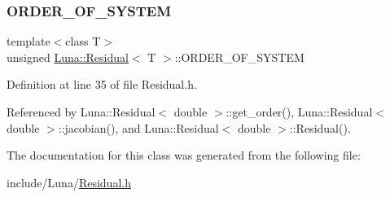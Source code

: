 \mbox{\label{classLuna_1_1Residual_a7facf1267eb277d84aeea8beba2cb200}} 
\subsubsection{\texorpdfstring{O\+R\+D\+E\+R\+\_\+\+O\+F\+\_\+\+S\+Y\+S\+T\+EM}{ORDER\_OF\_SYSTEM}}
{\footnotesize\ttfamily template$<$class T$>$ \\
unsigned \hyperlink{classLuna_1_1Residual}{Luna\+::\+Residual}$<$ T $>$\+::O\+R\+D\+E\+R\+\_\+\+O\+F\+\_\+\+S\+Y\+S\+T\+EM\hspace{0.3cm}{\ttfamily [protected]}}



Definition at line 35 of file Residual.\+h.



Referenced by Luna\+::\+Residual$<$ double $>$\+::get\+\_\+order(), Luna\+::\+Residual$<$ double $>$\+::jacobian(), and Luna\+::\+Residual$<$ double $>$\+::\+Residual().



The documentation for this class was generated from the following file\+:\begin{DoxyCompactItemize}
\item 
include/\+Luna/\hyperlink{Residual_8h}{Residual.\+h}\end{DoxyCompactItemize}
